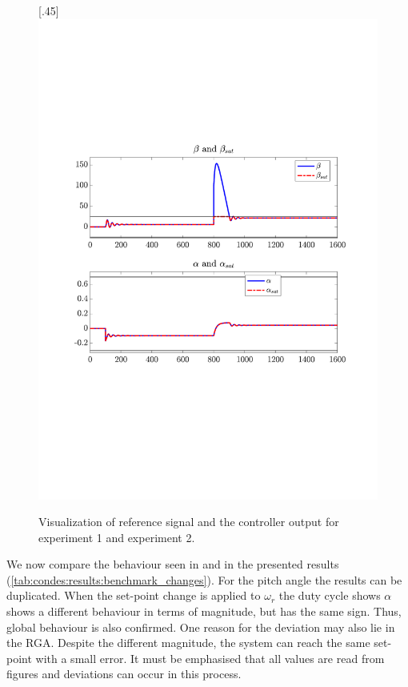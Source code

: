\begin{figure}[H]
[.45\textwidth]{\includegraphics[width=1\linewidth, scale=1, trim=60 230 55 150,clip]{fig/Open_loop/exp_2_in.pdf}}

    \caption{Visualization of reference signal and the controller output for experiment 1 and experiment 2.}
    \label{fig:condes:results:benchmark_compare}
\end{figure}


We now compare the behaviour seen in \cite{Fragoso_et_al_2017} and in the presented results (\autoref{tab:condes:results:benchmark_changes}).
For the pitch angle the results can be duplicated.
When the set-point change is applied to $\omega_r$ the duty cycle shows $\alpha$ shows a different behaviour in terms of magnitude, but has the same sign.
Thus, global behaviour is also confirmed.
One reason for the deviation may also lie in the RGA.
Despite the different magnitude, the system can reach the same set-point with a small error.
It must be emphasised that all values are read from figures and deviations can occur in this process.


